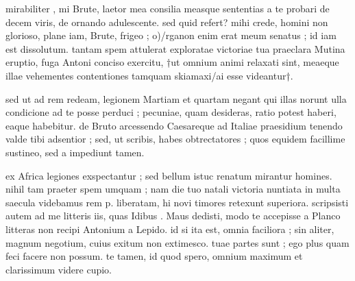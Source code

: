 


 mirabiliter , mi Brute, laetor mea consilia measque sententias a te probari de decem viris, de ornando adulescente. sed quid refert? mihi crede, homini non glorioso, plane iam, Brute, frigeo ; o)/rganon enim erat meum senatus ; id iam est dissolutum. tantam spem attulerat exploratae victoriae tua praeclara Mutina eruptio, fuga Antoni conciso exercitu, †ut omnium animi relaxati sint, meaeque illae vehementes contentiones tamquam skiamaxi/ai esse videantur†.

 sed ut ad rem redeam, legionem Martiam et quartam negant qui illas norunt ulla condicione ad te posse perduci ; pecuniae, quam desideras, ratio potest haberi, eaque habebitur. de Bruto arcessendo Caesareque ad Italiae praesidium tenendo valde tibi adsentior ; sed, ut scribis, habes obtrectatores ; quos equidem facillime sustineo, sed a impediunt tamen.

 ex Africa legiones exspectantur ; sed bellum istuc renatum mirantur homines. nihil tam praeter spem umquam ; nam die tuo natali victoria nuntiata in multa saecula videbamus rem p. liberatam, hi novi timores retexunt superiora. scripsisti autem ad me litteris iis, quas Idibus . Maus dedisti, modo te accepisse a Planco litteras non recipi Antonium a Lepido. id si ita est, omnia faciliora ; sin aliter, magnum negotium, cuius exitum non extimesco. tuae partes sunt ; ego plus quam feci facere non possum. te tamen, id quod spero, omnium maximum et clarissimum videre cupio.
